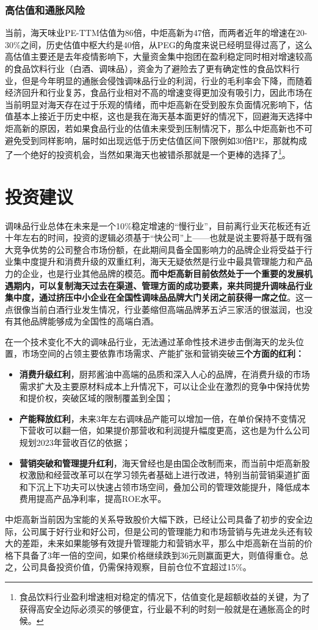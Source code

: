 \documentclass[UTF8,a4paper,zihao=-4,fontset = windows]{ctexart} %
\begin{document}
\section{高估值和通胀风险}
当前，海天味业PE-TTM估值为86倍，中炬高新为47倍，而两者近年的增速在20-30\%之间，历史估值中枢大约是40倍，从PEG的角度来说已经明显得过高了，这么高估值主要还是去年疫情影响下，大量资金集中抱团在盈利稳定同时相对增速较高的食品饮料行业（白酒、调味品），资金为了避险去了更有确定性的食品饮料行业，但是今年明显的通胀会侵蚀调味品行业的利润，行业的毛利率会下降，而随着经济回升和行业复苏，食品行业相对不高的增速变得更加没有吸引力，因此市场在当前明显对海天存在过于乐观的情绪，而中炬高新在受到股东负面情况影响下，估值基本上接近于历史中枢，这也是我在海天基本面更好的情况下，回避海天选择中炬高新的原因，若如果食品行业的估值未来受到压制情况下，那么中炬高新也不可避免受到同样影响，届时如出现远低于历史估值区间下限例如30倍PE，那就构成了一个绝好的投资机会，当然如果海天也被错杀那就是一个更棒的选择了\footnote{食品饮料行业盈利增速相对稳定的情况下，估值变化是超额收益的关键，为了获得高安全边际必须买的够便宜，行业最不利的时刻一般就是在通胀高企的时候。}。

\part{投资建议}
调味品行业总体在未来是一个10\%稳定增速的“慢行业”，目前离行业天花板还有近十年左右的时间，投资的逻辑必须基于“快公司”上——也就是说主要将基于既有强大竞争优势的公司整合市场份额，在此期间具备全国影响力的品牌企业将受益于行业集中度提升和消费升级的双重红利，海天无疑依然是行业中最具管理能力和产品力的企业，也是行业其他品牌的模范。\textbf{而中炬高新目前依然处于一个重要的发展机遇期内，可以复制海天过去在渠道、管理方面的成功要素，来共同提升调味品行业集中度，通过挤压中小企业在全国性调味品品牌大门关闭之前获得一席之位}。这一点很像当前白酒行业发生情况，行业萎缩但高端品牌茅五泸三家活的很滋润，也没有其他品牌能够成为全国性的高端白酒。

在一个技术变化不大的调味品行业，无法通过革命性技术进步击倒海天的龙头位置，市场空间的占领主要依靠市场需求、产能扩张和营销突破\textbf{三个方面的红利：}
\begin{itemize}
    \item \noindent \textbf{消费升级红利}，厨邦酱油中高端的品质和深入人心的品牌，在消费升级的市场需求扩大及主要原材料成本上升情况下，可以让企业在激烈的竞争中保持优势和提价权，突破区域的限制覆盖到全国；
    
    \item \noindent \textbf{产能释放红利}，未来3年左右调味品产能可以增加一倍，在单价保持不变情况下营收可以翻一倍，如果提价那营收和利润提升幅度更高，这也是为什么公司规划2023年营收百亿的依据；
    
    \item \noindent \textbf{营销突破和管理提升红利}，海天曾经也是由国企改制而来，而当前中炬高新股权激励和经营改革可以在学习领先者基础上进行改进，特别当前营销渠道扩面和下沉上下功夫可以快速占领市场空间，叠加公司的管理效能提升，降低成本费用提高产品净利率，提高ROE水平。
    \end{itemize}

中炬高新当前因为宝能的关系导致股价大幅下跌，已经让公司具备了初步的安全边际，公司属于好行业和好公司，但是公司的管理能力和市场营销与先进龙头还有较大的差距，未来如果能够有效提升管理能力和营销水平，那么中炬高新在当前的价格下具备了3年一倍的空间，如果价格继续跌到36元则赢面更大，则值得重仓。总之，公司具备投资价值，仍需保持观察，目前仓位不宜超过15\%。
\end{document}

